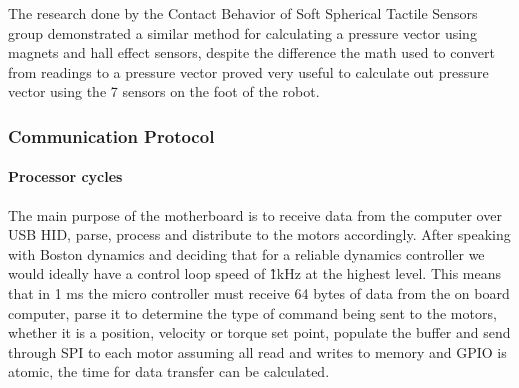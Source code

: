         The research done by the Contact Behavior of Soft Spherical Tactile Sensors\cite{youssefian2014contact} group demonstrated a similar method for calculating a pressure vector using magnets and hall effect sensors, despite the difference the math used to convert from readings to a pressure vector proved very useful to calculate out pressure vector using the 7 sensors on the foot of the robot. 
        \subsubsection{Communication Protocol}
            \paragraph{Processor cycles}
                The main purpose of the motherboard is to receive data from the computer over USB HID, parse, process and distribute to the motors accordingly. After speaking with Boston dynamics and deciding that for a reliable dynamics controller we would ideally have a control loop speed of \~ 1kHz at the highest level. This means that in 1 ms the micro controller must receive 64 bytes of data from the on board computer, parse it to determine the type of command being sent to the motors, whether it is a position, velocity or torque set point, populate the buffer and send through SPI to each motor assuming all read and writes to memory and GPIO is atomic, the time for data transfer can be calculated. \newline
